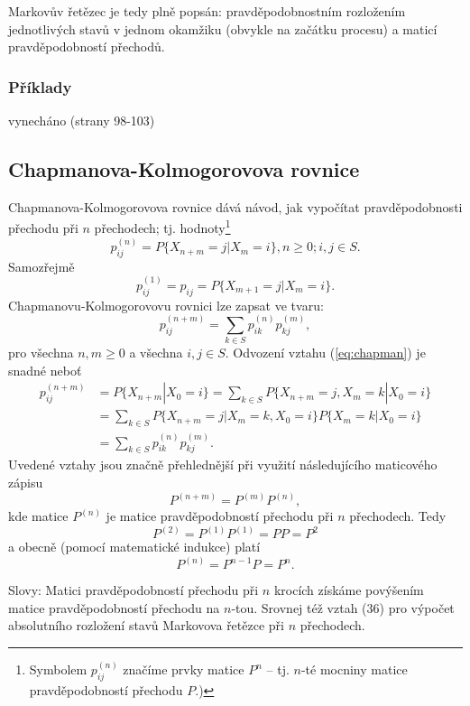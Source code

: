 \documentclass[10pt]{article}
\begin{document}
Markovův řetězec je tedy plně popsán: pravděpodobnostním rozložením jednotlivých stavů v jednom okamžiku (obvykle na začátku procesu) a maticí pravděpodobností přechodů.

\subsubsection{Příklady}
vynecháno (strany 98-103)
\subsection{Chapmanova-Kolmogorovova rovnice}
Chapmanova-Kolmogorovova rovnice dává návod, jak vypočítat pravděpodobnosti přechodu při $n$ přechodech; tj. hodnoty\footnote{Symbolem $p_{ij}^{(n)}$ značíme prvky matice $P^n$ -- tj. $n$-té mocniny matice pravděpodobností přechodu $P$.)} $$p_{ij}^{(n)} = P\{X_{n+m}=j|X_m=i\}, n \geq 0; i,j \in S.$$ Samozřejmě $$p_{ij}^{(1)}= p_{ij} = P\{X_{m+1}=j|X_m=i\}.$$ Chapmanovu-Kolmogorovovu rovnici lze zapsat ve tvaru:
\begin{equation}
\label{eq:chapman}
p_{ij}^{(n+m)} = \sum_{k \in S} p_{ik}^{(n)} p_{kj}^{(m)},
\end{equation}
pro všechna $n,m \geq 0$ a všechna $i,j \in S$. Odvození vztahu (\ref{eq:chapman}) je snadné neboť
\begin{equation}
\begin{split}
p_{ij}^{(n+m)} 	&=P\{X_{n+m}|X_0=i\} = \sum_{k\in S} P\{X_{n+m}=j,X_m=k|X_0=i\}\\
			&=\sum_{k\in S} P\{X_{n+m}=j|X_m=k,X_0=i\}P\{X_m=k|X_0=i\}\\
			&=\sum_{k \in S} p_{ik}^{(n)} p_{kj}^{(m)}.
\end{split}
\end{equation}
Uvedené vztahy jsou značně přehlednější při využití následujícího maticového zápisu 
\begin{equation}
P^{(n+m)} = P^{(m)}P^{(n)},
\end{equation} kde matice $P^{(n)}$ je matice pravděpodobností přechodu při $n$ přechodech. Tedy $$P^{(2)} = P^{(1)}P^{(1)}=PP=P^2$$ a obecně (pomocí matematické indukce) platí \begin{equation}P^{(n)} = P^{n-1}P = P^n. \end{equation}

Slovy: Matici pravděpodobností přechodu při $n$ krocích získáme povýšením matice pravděpodobností přechodu na $n$-tou. Srovnej též vztah (36) pro výpočet absolutního rozložení stavů Markovova řetězce při $n$ přechodech.
\end{document}
